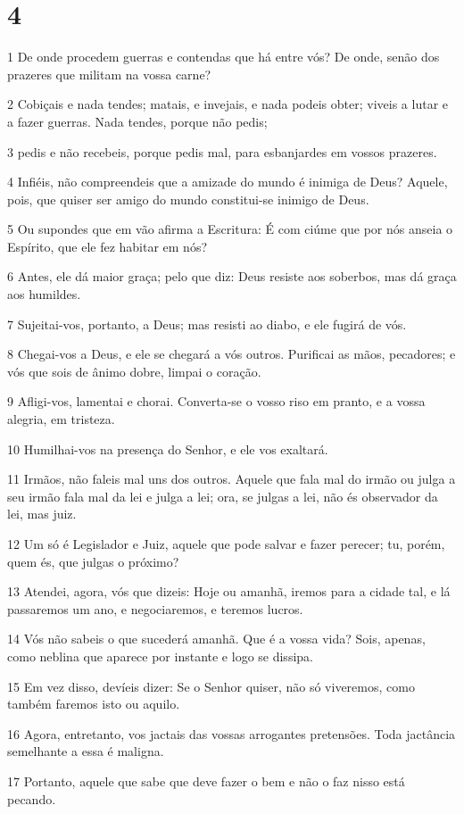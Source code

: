 \chapter{4}

\par 1 De onde procedem guerras e contendas que há entre vós? De onde, senão dos prazeres que militam na vossa carne?
\par 2 Cobiçais e nada tendes; matais, e invejais, e nada podeis obter; viveis a lutar e a fazer guerras. Nada tendes, porque não pedis;
\par 3 pedis e não recebeis, porque pedis mal, para esbanjardes em vossos prazeres.
\par 4 Infiéis, não compreendeis que a amizade do mundo é inimiga de Deus? Aquele, pois, que quiser ser amigo do mundo constitui-se inimigo de Deus.
\par 5 Ou supondes que em vão afirma a Escritura: É com ciúme que por nós anseia o Espírito, que ele fez habitar em nós?
\par 6 Antes, ele dá maior graça; pelo que diz: Deus resiste aos soberbos, mas dá graça aos humildes.
\par 7 Sujeitai-vos, portanto, a Deus; mas resisti ao diabo, e ele fugirá de vós.
\par 8 Chegai-vos a Deus, e ele se chegará a vós outros. Purificai as mãos, pecadores; e vós que sois de ânimo dobre, limpai o coração.
\par 9 Afligi-vos, lamentai e chorai. Converta-se o vosso riso em pranto, e a vossa alegria, em tristeza.
\par 10 Humilhai-vos na presença do Senhor, e ele vos exaltará.
\par 11 Irmãos, não faleis mal uns dos outros. Aquele que fala mal do irmão ou julga a seu irmão fala mal da lei e julga a lei; ora, se julgas a lei, não és observador da lei, mas juiz.
\par 12 Um só é Legislador e Juiz, aquele que pode salvar e fazer perecer; tu, porém, quem és, que julgas o próximo?
\par 13 Atendei, agora, vós que dizeis: Hoje ou amanhã, iremos para a cidade tal, e lá passaremos um ano, e negociaremos, e teremos lucros.
\par 14 Vós não sabeis o que sucederá amanhã. Que é a vossa vida? Sois, apenas, como neblina que aparece por instante e logo se dissipa.
\par 15 Em vez disso, devíeis dizer: Se o Senhor quiser, não só viveremos, como também faremos isto ou aquilo.
\par 16 Agora, entretanto, vos jactais das vossas arrogantes pretensões. Toda jactância semelhante a essa é maligna.
\par 17 Portanto, aquele que sabe que deve fazer o bem e não o faz nisso está pecando.

